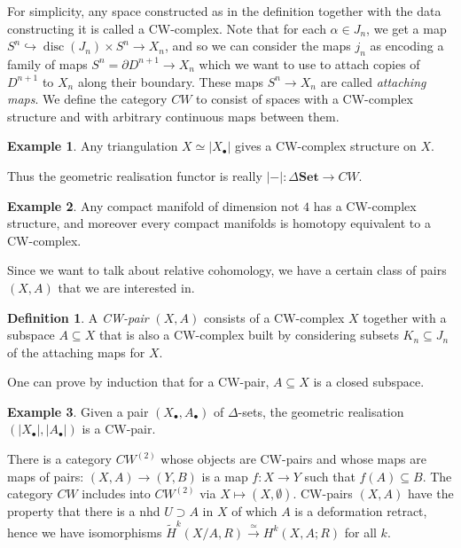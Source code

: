 \documentclass{tufte-handout}
\def\into {\hookrightarrow}
\def\Set {\mathbf{Set}}
\DeclareMathOperator{\disc}{disc}
\theoremstyle{definition}
\newtheorem{definition}{Definition}
\newtheorem{example}{Example}
\begin{document}
For simplicity, any space constructed as in the definition together with the data constructing 
it is called a CW-complex. Note that for each $\alpha\in J_n$, we get a map $S^n \into 
\disc(J_n) \times S^n \to X_n$, and so we can consider the maps $j_n$ as encoding a family of 
maps $S^n = \partial D^{n+1} \to X_n$ which we want to use to attach copies of $D^{n+1}$ to 
$X_n$ along their boundary. These maps $S^n \to X_n$ are called \emph{attaching maps}. We define 
the category $CW$ to consist of spaces with a CW-complex structure and with arbitrary continuous 
maps between them.


\begin{example}
Any triangulation $X \simeq |X_\bullet|$ gives a CW-complex structure on $X$.
\end{example}

Thus the geometric realisation functor is really $|-|\colon \Delta\Set \to CW$.

\begin{example}
Any compact manifold of dimension not $4$ has a CW-complex structure, and moreover every compact manifolds
is homotopy equivalent to a CW-complex.
\end{example}

Since we want to talk about relative cohomology, we have a certain class of pairs $(X,A)$ that we are interested in.

\begin{definition}
A \emph{CW-pair} $(X,A)$ consists of a CW-complex $X$ together with a subspace $A\subseteq X$ that is also
a CW-complex built by considering subsets $K_n \subseteq J_n$ of the attaching maps for $X$.
\end{definition}

One can prove by induction that for a CW-pair, $A\subseteq X$ is a closed subspace.

\begin{example}
Given a pair $(X_\bullet,A_\bullet)$ of $\Delta$-sets, the geometric realisation $(|X_\bullet|,|A_\bullet|)$ is a CW-pair.
\end{example}

There is a category $CW^{(2)}$ whose objects are CW-pairs and whose maps are maps of pairs: $(X,A) \to (Y,B)$ is a map $f\colon X\to Y$ such that $f(A) \subseteq B$.
The category $CW$ includes into $CW^{(2)}$ via $X\mapsto (X,\emptyset)$.
CW-pairs $(X,A)$ have the property that there is a nhd $U \supset A$ in $X$ of which $A$ is a deformation retract, hence
we have isomorphisms $\widetilde{H}^k(X/A,R) \xrightarrow{\simeq}H^k(X,A;R)$ for all $k$. 
\end{document}
